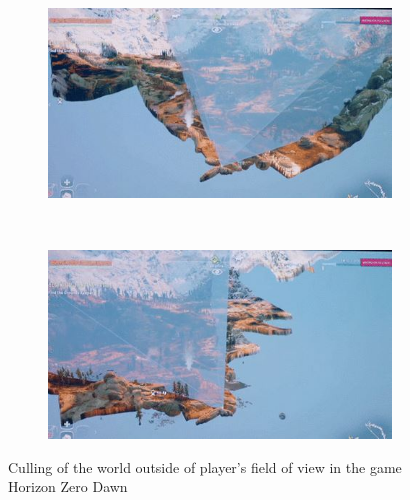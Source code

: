 \fi
\begin{figure}[H]
	\centering
	\begin{subfigure}[b]{0.4\textwidth}
		\centering
		\includegraphics[width=\textwidth]{assets/culling-1}
	\end{subfigure}
	~
	\begin{subfigure}[b]{0.4\textwidth}
		\centering
		\includegraphics[width=\textwidth]{assets/culling-2}
	\end{subfigure}

	\caption{Culling of the world outside of player's field of view in the game Horizon Zero Dawn}
	\label{fig:culling}
\end{figure}
\iftwocolumns
